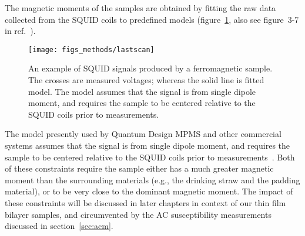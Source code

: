 The magnetic moments of the samples are obtained by fitting the raw data collected from the SQUID coils to predefined models (figure~\ref{fig:lastscan}, also see figure~3-7 in ref.~\cite{mpms_software}). %
\begin{figure}[ht]%
	\centering%
    \texttt{[image: figs\_methods/lastscan]}%
    \caption[An example of SQUID signals.]{\label{fig:lastscan}An example of SQUID signals produced by a ferromagnetic sample. The crosses are measured voltages; whereas the solid line is fitted model. The model assumes that the signal is from single dipole moment, and requires the sample to be centered relative to the SQUID coils prior to measurements.}%
\end{figure}%
The model presently used by Quantum Design MPMS and other commercial systems assumes that the signal is from single dipole moment, and requires the sample to be centered relative to the SQUID coils prior to measurements~\cite{mpms_software, squid_bg, squid_center_error}. Both of these constraints require the sample either has a much greater magnetic moment than the surrounding materials (e.g., the drinking straw and the padding material), or to be very close to the dominant magnetic moment. The impact of these constraints will be discussed in later chapters in context of our thin film bilayer samples, and circumvented by the AC susceptibility measurements discussed in section~\ref{sec:acm}.
